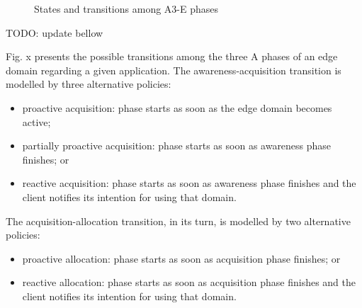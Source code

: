 \begin{figure}[htbp]
	\raggedright
	\hfill
	
	\hfill
	\caption{States and transitions among A3-E phases} \label{fig:A3-E-phases}
\end{figure}

TODO: update bellow

Fig. x presents the possible transitions among the three A phases of an edge domain regarding a given application. The awareness-acquisition transition is modelled by three alternative policies: 

\begin{itemize}

\item proactive acquisition: phase starts as soon as the edge domain becomes active; 

\item partially proactive acquisition: phase starts as soon as awareness phase finishes; or

\item reactive acquisition: phase starts as soon as awareness phase finishes and the client notifies its intention for using that domain.

\end{itemize}

The acquisition-allocation transition, in its turn, is modelled by two alternative policies: 

\begin{itemize}

\item proactive allocation: phase starts as soon as acquisition phase finishes; or

\item reactive allocation: phase starts as soon as acquisition phase finishes and the client notifies its intention for using that domain.

\end{itemize}

